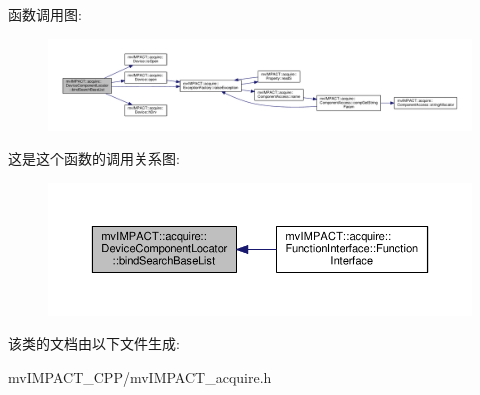 函数调用图\+:
\nopagebreak
\begin{figure}[H]
\begin{center}
\leavevmode
\includegraphics[width=350pt]{classmv_i_m_p_a_c_t_1_1acquire_1_1_device_component_locator_af77f54da12e74ce5100afbb8cd8b12c7_cgraph}
\end{center}
\end{figure}




这是这个函数的调用关系图\+:
\nopagebreak
\begin{figure}[H]
\begin{center}
\leavevmode
\includegraphics[width=350pt]{classmv_i_m_p_a_c_t_1_1acquire_1_1_device_component_locator_af77f54da12e74ce5100afbb8cd8b12c7_icgraph}
\end{center}
\end{figure}




该类的文档由以下文件生成\+:\begin{DoxyCompactItemize}
\item 
mv\+I\+M\+P\+A\+C\+T\+\_\+\+C\+P\+P/mv\+I\+M\+P\+A\+C\+T\+\_\+acquire.\+h\end{DoxyCompactItemize}

